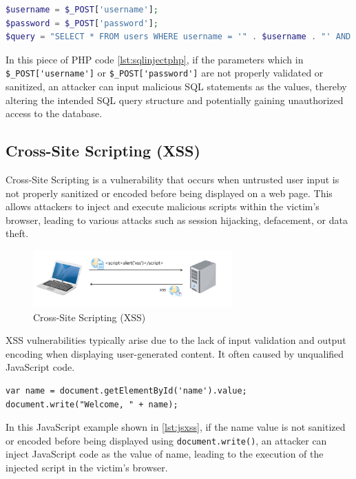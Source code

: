 \documentclass[journal]{IEEEtran}
\begin{document}
\begin{lstlisting}[caption={PHP code SQL Injection},label={lst:sqlinjectphp},
  language=PHP,breaklines=true]
$username = $_POST['username'];
$password = $_POST['password'];
$query = "SELECT * FROM users WHERE username = '" . $username . "' AND password = '" . $password . "'";
\end{lstlisting}

In this piece of PHP code \ref{lst:sqlinjectphp}, if the parameters which in \verb|$_POST['username']| or \verb|$_POST['password']| are not properly validated or sanitized, an attacker can input malicious SQL statements as the values, thereby altering the intended SQL query structure and potentially gaining unauthorized access to the database.

\subsection{Cross-Site Scripting (XSS)}
Cross-Site Scripting is a vulnerability that occurs when untrusted user input is not properly sanitized or encoded before being displayed on a web page. This allows attackers to inject and execute malicious scripts within the victim's browser, leading to various attacks such as session hijacking, defacement, or data theft. 

\begin{figure}[h]
  \centering
  \includegraphics[width=3in]{figures/xss.png}
  \caption{Cross-Site Scripting (XSS)}
  \label{fig:xss}
  \end{figure}

XSS vulnerabilities typically arise due to the lack of input validation and output encoding when displaying user-generated content. It often caused by unqualified JavaScript code.

\begin{lstlisting}[caption={JavaScript Cross-Site Scripting (XSS)},label={lst:jsxss},language=HTML,breaklines=true]
var name = document.getElementById('name').value;
document.write("Welcome, " + name);
\end{lstlisting}

In this JavaScript example shown in \ref{lst:jsxss}, if the name value is not sanitized or encoded before being displayed using \verb|document.write()|, an attacker can inject JavaScript code as the value of name, leading to the execution of the injected script in the victim's browser.
\end{document}

